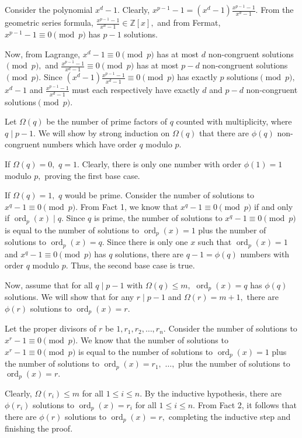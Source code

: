 \documentclass[blue,onecol]{shooting}
\begin{document}
\begin{pro}
Consider the polynomial $x^d - 1.$ Clearly, $x^{p-1} - 1 = (x^d - 1) \frac{x^{p-1}-1}{x^d-1}.$ From the geometric series formula, $\frac{x^{p-1}-1}{x^d-1} \in \mathbb{Z}[x],$ and from Fermat, $x^{p-1}-1 \equiv 0 \pmod{p}$ has $p-1$ solutions.

Now, from Lagrange, $x^d - 1 \equiv 0 \pmod{p}$ has at most $d$ non-congruent solutions$\pmod{p},$ and $\frac{x^{p-1}-1}{x^d-1} \equiv 0 \pmod{p}$ has at most $p - d$ non-congruent solutions$\pmod{p}.$ Since $(x^d - 1) \frac{x^{p-1}-1}{x^d-1} \equiv 0 \pmod{p}$ has exactly $p$ solutions$\pmod{p},$ $x^d-1$ and $\frac{x^{p-1}-1}{x^d-1}$ must each respectively have exactly $d$ and $p-d$ non-congruent solutions$\pmod{p}.$

Let $\Omega(q)$ be the number of prime factors of $q$ counted with multiplicity, where $q \mid p-1.$ We will show by strong induction on $\Omega(q)$ that there are $\phi(q)$ non-congruent numbers which have order $q$ modulo $p.$

If $\Omega(q) = 0,$ $q = 1.$ Clearly, there is only one number with order $\phi(1) = 1$ modulo $p,$ proving the first base case.

If $\Omega(q) = 1,$ $q$ would be prime. Consider the number of solutions to $x^q - 1 \equiv 0 \pmod{p}.$ From Fact 1, we know that $x^q - 1 \equiv 0 \pmod{p}$ if and only if $\operatorname{ord}_p(x) \mid q.$ Since $q$ is prime, the number of solutions to $x^q - 1 \equiv 0 \pmod{p}$ is equal to the number of solutions to $\operatorname{ord}_p(x) = 1$ plus the number of solutions to $\operatorname{ord}_p(x) = q.$ Since there is only one $x$ such that $\operatorname{ord}_p(x) = 1$ and $x^q - 1 \equiv 0 \pmod{p}$ has $q$ solutions, there are $q-1 = \phi(q)$ numbers with order $q$ modulo $p.$ Thus, the second base case is true.

Now, assume that for all $q \mid p-1$ with $\Omega(q) \le m,$ $\operatorname{ord}_p(x) = q$ has $\phi(q)$ solutions. We will show that for any $r \mid p-1$ and $\Omega(r) = m+1,$ there are $\phi(r)$ solutions to $\operatorname{ord}_p(x) = r.$

Let the proper divisors of $r$ be $1, r_1, r_2, \dots, r_n.$ Consider the number of solutions to $x^r - 1 \equiv 0 \pmod{p}.$ We know that the number of solutions to $x^r - 1 \equiv 0 \pmod{p}$ is equal to the number of solutions to $\operatorname{ord}_p(x) = 1$ plus the number of solutions to $\operatorname{ord}_p(x) = r_1,$ $\dots,$ plus the number of solutions to $\operatorname{ord}_p(x) = r.$

Clearly, $\Omega(r_i) \le m$ for all $1 \le i \le n.$ By the inductive hypothesis, there are $\phi(r_i)$ solutions to $\operatorname{ord}_p(x) = r_i$ for all $1 \le i \le n.$ From Fact 2, it follows that there are $\phi(r)$ solutions to $\operatorname{ord}_p(x) = r,$ completing the inductive step and finishing the proof.
\end{pro}
\end{document}
